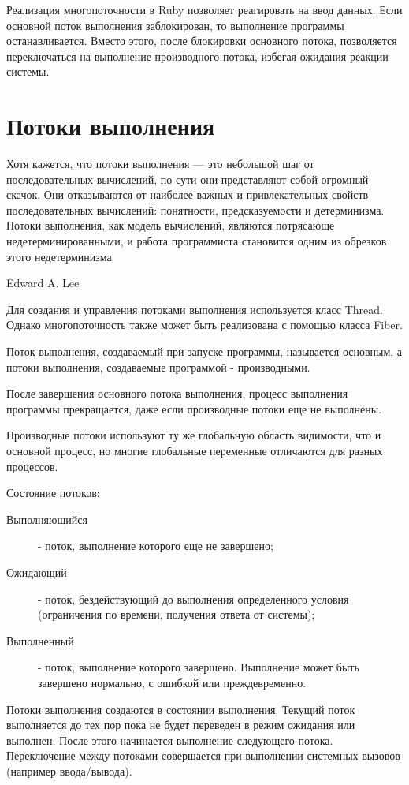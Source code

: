 Реализация многопоточности в Ruby позволяет реагировать на ввод данных. Если основной поток выполнения заблокирован, то выполнение программы останавливается. Вместо этого, после блокировки основного потока, позволяется переключаться на выполнение производного потока, избегая ожидания реакции системы.

\section{Потоки выполнения}

\epigraph
{Хотя кажется, что потоки выполнения — это небольшой шаг от последовательных вычислений, по сути они представляют собой огромный скачок. Они отказываются от наиболее важных и привлекательных свойств последовательных вычислений: понятности, предсказуемости и детерминизма. Потоки выполнения, как модель вычислений, являются потрясающе недетерминированными, и работа программиста становится одним из обрезков этого недетерминизма.}
{Edward A. Lee}

Для создания и управления потоками выполнения используется класс Thread. Однако многопоточность также может быть реализована с помощью класса Fiber.

Поток выполнения, создаваемый при запуске программы, называется основным, а потоки выполнения, создаваемые программой - производными.

После завершения основного потока выполнения, процесс выполнения программы прекращается, даже если производные потоки еще не выполнены.

Производные потоки используют ту же глобальную область видимости, что и основной процесс, но многие глобальные переменные отличаются для разных процессов.

Состояние потоков:
\begin{description}
  \item[Выполняющийся] - поток, выполнение которого еще не завершено; 
  \item[Ожидающий] - поток, бездействующий до выполнения определенного условия (ограничения по времени, получения ответа от системы);
  \item[Выполненный] - поток, выполнение которого завершено. Выполнение может быть завершено нормально, с ошибкой или преждевременно.
\end{description}

Потоки выполнения создаются в состоянии выполнения. Текущий поток выполняется до тех пор пока не будет переведен в режим ожидания или выполнен. После этого начинается выполнение следующего потока. Переключение между потоками совершается при выполнении системных вызовов (например ввода/вывода). 

